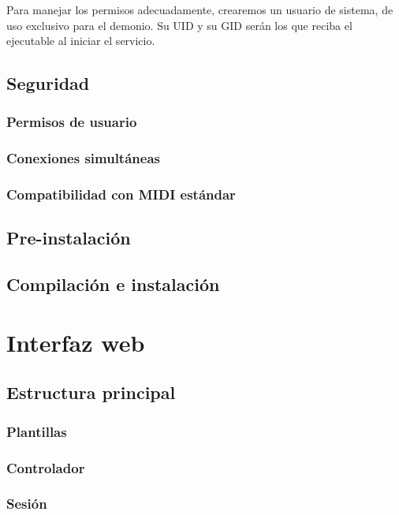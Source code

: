 Para manejar los permisos adecuadamente, crearemos un usuario de sistema, de uso exclusivo para el demonio. Su \acrshort{UID} y su \acrshort{GID} serán los que reciba el ejecutable al iniciar el servicio.

\subsection{Seguridad}
\subsubsection{Permisos de usuario}
\subsubsection{Conexiones simultáneas}
\subsubsection{Compatibilidad con MIDI estándar}

\subsection{Pre-instalación}

\subsection{Compilación e instalación}





\section{Interfaz web}

\subsection{Estructura principal}
\subsubsection{Plantillas}
\subsubsection{Controlador}
\subsubsection{Sesión}

